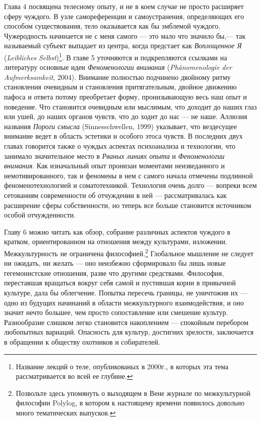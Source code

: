 \documentclass[12pt]{book}
\begin{document}
Глава 4 посвящена телесному опыту, и не в коем случае не просто расширяет сферу чуждого. В узле самореференции и самоустранения, определяющих его способом существования, тело оказывается как бы эмблемой чуждого. Чужеродность начинается не с меня самого --- это мало что значило бы,--- так называемый субъект выпадает из центра, когда предстает как \textit{Воплощенное Я} (\textit{Leibliches Selbst})\footnote{Название лекций о теле, опубликованых в 2000г., в которых эта тема рассматривается во всей ее глубине.}. В главе 5 уточняются и подкрепляются ссылками на литературу основные идеи \textit{Феноменологии внимания} (\textit{Phänomenologie der Aufmerksamkeit}, 2004). Внимание полностью подчинено двойному ритму становления очевидным и становления притягательным, двойное движению пафоса и ответа потому преобретает форму, пронизывающую весь наш опыт и поведение. Что становится очевидным или мыслимым, что доходит до наших глаз или ушей, до наших органов чувств, что до ходит до нас --- не наше. Аллюзия названия \textit{Пороги смысла} (Sinnesschwellen, 1999) указывает, что вездесущее внимание ведет в область эстетики и особого этоса чувств. В последних двух главах говорится также о чуждых аспектах психоанализа и технологии, что занимало значительное место в \textit{Рваных линиях опыта} и \textit{Феноменологии внимания}. Как изначальный опыт пронизан моментами неизведанного и немотивированного, так и феномены в нем с самого начала отмечены подлинной феноменотехнологией и соматотехникой. Технология очень долго --- вопреки всем сетованиям современности об отчуждении в ней --- рассматривалась как расширение сферы собственности, но теперь все больше становится источником особой отчужденности.

Главу 6 можно читать как обзор, собрание различных аспектов чуждого в кратком, ориентированном на отношения между культурами, изложении. Межкультурность не ограничена философией.\footnote{Позвольте здесь упомянуть о выходящем в Вене журнале по межкультурной философии Polylog, в котором к настоящему времени появилось довольно много тематических выпусков.} Глобальное мышление не следует ни ожидать, ни желать --- оно неизбежно сформировало бы лишь новые гегемонистские отношения, разве что другими средствами. Философия, переставшая вращаться вокруг себя самой и пустившая корни в привычной культуре, дала бы облегчение. Попытка пересечь границы, не уничтожив их --- одно из будущих начинаний в области межкультурного взаимодействия, и оно значит нечто большее, чем просто сопоставление или смешение культур. Разнообразие слишком легко становится накоплением --- спокойным перебором любопытных вариаций. Опасность для культур, достигних зрелости, заключается в обращении к обществу охотников и собирателей.
\end{document}
